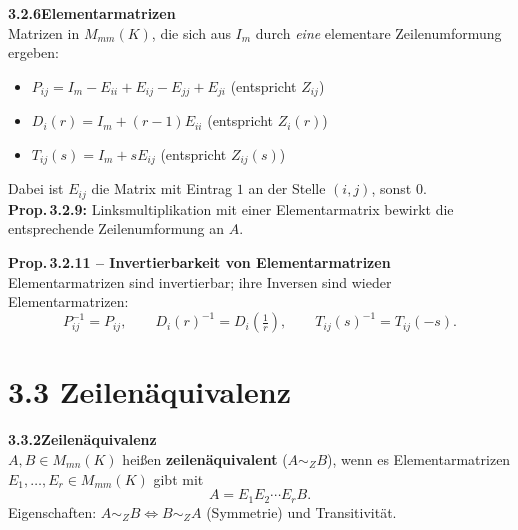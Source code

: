 \documentclass[a4paper,12pt]{article}
\newcommand{\gentry}[3]{%
  \noindent\textbf{#1\quad #2}\nopagebreak\\[0.2em]
  #3\par\smallskip
}
\begin{document}
\gentry{3.2.6}{Elementarmatrizen}{%
  Matrizen in $M_{mm}(K)$, die sich aus $I_m$ durch \emph{eine} elementare
  Zeilenumformung ergeben:
  \begin{itemize}[topsep=2pt,itemsep=1pt]
    \item $P_{ij} = I_m - E_{ii} + E_{ij} - E_{jj} + E_{ji}$
          \quad (entspricht $Z_{ij}$)
    \item $D_i(r) = I_m + (r-1)E_{ii}$
          \quad (entspricht $Z_i(r)$)
    \item $T_{ij}(s) = I_m + s E_{ij}$
          \quad (entspricht $Z_{ij}(s)$)
  \end{itemize}
  Dabei ist $E_{ij}$ die Matrix mit Eintrag $1$ an der Stelle $(i,j)$,
  sonst $0$.
  \smallskip\\
  \textbf{Prop.\,3.2.9:} Linksmultiplikation mit einer Elementarmatrix
  bewirkt die entsprechende Zeilenumformung an $A$.
}

\gentry{}{Prop.\,3.2.11 -- Invertierbarkeit von Elementarmatrizen}{%
  Elementarmatrizen sind invertierbar; ihre Inversen sind wieder
  Elementarmatrizen:
  \[
    P_{ij}^{-1} = P_{ij}, \qquad
    D_i(r)^{-1} = D_i\!\left(\tfrac{1}{r}\right), \qquad
    T_{ij}(s)^{-1} = T_{ij}(-s).
  \]
}

\section*{3.3 \quad Zeilenäquivalenz}

\gentry{3.3.2}{Zeilenäquivalenz}{%
  $A, B \in M_{mn}(K)$ heißen \textbf{zeilenäquivalent} ($A \sim_Z B$),
  wenn es Elementarmatrizen $E_1, \ldots, E_r \in M_{mm}(K)$ gibt mit
  \[
    A = E_1 E_2 \cdots E_r B.
  \]
  Eigenschaften: $A \sim_Z B \Leftrightarrow B \sim_Z A$
  (Symmetrie) und Transitivität.
}
\end{document}
